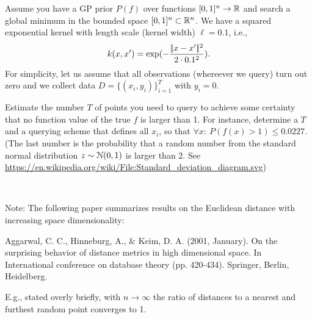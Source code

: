 
Assume you have a GP prior $P(f)$ over functions $[0,1]^n\to {\mathbb{R}}$ and search a global minimum in the bounded space $[0,1]^n \subset {\mathbb{R}}^n$. We have a squared exponential kernel with length scale (kernel width) $\ell = 0.1$, i.e.,\ $$k(x,x')=\exp(-\frac{|\!|x-x'|\!|^2}{2\cdot 0.1^2}).$$ For simplicity, let us assume that all observations (whereever we query) turn out zero and we collect data $D=\{(x_i,y_i)\}_{i=1}^T$ with $y_i=0$.

Estimate the number $T$ of points you need to query to achieve some certainty that no function value of the true $f$ is larger than 1. For instance, determine a $T$ and a querying scheme that defines all $x_i$, so that $\forall  x:~ P(f(x)>1) \le 0.0227$. (The last number is the probability that a random number from the standard normal distribution $z\sim{\cal N}(0,1)$ is larger than $2$. See \url{https://en.wikipedia.org/wiki/File:Standard_deviation_diagram.svg})


~

Note: The following paper summarizes results on the Euclidean distance with increasing space dimensionality:

Aggarwal, C. C., Hinneburg, A., \& Keim, D. A. (2001, January). On the surprising behavior of distance metrics in high dimensional space. In International conference on database theory (pp. 420-434). Springer, Berlin, Heidelberg.

E.g., stated overly briefly, with $n\to\infty$ the ratio of distances to a nearest and furthest random point converges to 1.



\exerfoot
